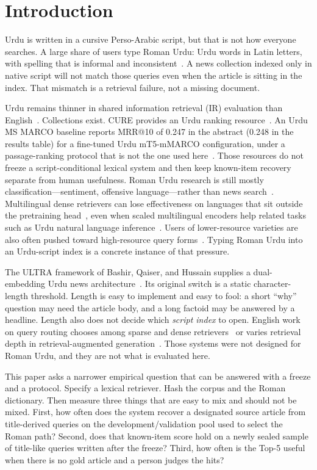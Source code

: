 \documentclass[10pt,letterpaper]{article}
\begin{document}
\clearpage
{}
\linenumbers

\section*{Introduction}
Urdu is written in a cursive Perso-Arabic script, but that is not how everyone searches. A large share of users type Roman Urdu: Urdu words in Latin letters, with spelling that is informal and inconsistent~\cite{bib1,bib2,bib3}. A news collection indexed only in native script will not match those queries even when the article is sitting in the index. That mismatch is a retrieval failure, not a missing document.

Urdu remains thinner in shared information retrieval (IR) evaluation than English~\cite{bib4}. Collections exist. CURE provides an Urdu ranking resource~\cite{bib5}. An Urdu MS MARCO baseline reports MRR@10 of 0.247 in the abstract (0.248 in the results table) for a fine-tuned Urdu mT5-mMARCO configuration, under a passage-ranking protocol that is not the one used here~\cite{bib6}. Those resources do not freeze a script-conditional lexical system and then keep known-item recovery separate from human usefulness. Roman Urdu research is still mostly classification---sentiment, offensive language---rather than news search~\cite{bib1,bib2}. Multilingual dense retrievers can lose effectiveness on languages that sit outside the pretraining head~\cite{bib7}, even when scaled multilingual encoders help related tasks such as Urdu natural language inference~\cite{bib8}. Users of lower-resource varieties are also often pushed toward high-resource query forms~\cite{bib9}. Typing Roman Urdu into an Urdu-script index is a concrete instance of that pressure.

The ULTRA framework of Bashir, Qaiser, and Hussain supplies a dual-embedding Urdu news architecture~\cite{bib10}. Its original switch is a static character-length threshold. Length is easy to implement and easy to fool: a short ``why'' question may need the article body, and a long factoid may be answered by a headline. Length also does not decide which \emph{script index} to open. English work on query routing chooses among sparse and dense retrievers~\cite{bib11} or varies retrieval depth in retrieval-augmented generation~\cite{bib12}. Those systems were not designed for Roman Urdu, and they are not what is evaluated here.

This paper asks a narrower empirical question that can be answered with a freeze and a protocol. Specify a lexical retriever. Hash the corpus and the Roman dictionary. Then measure three things that are easy to mix and should not be mixed. First, how often does the system recover a designated source article from title-derived queries on the development/validation pool used to select the Roman path? Second, does that known-item score hold on a newly sealed sample of title-like queries written after the freeze? Third, how often is the Top-5 useful when there is no gold article and a person judges the hits?
\end{document}

